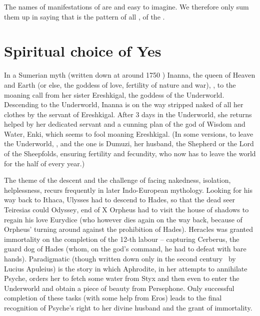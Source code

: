 The names of manifestations of  are  and easy to
imagine. We therefore only sum them up in saying that  is 
the pattern of all ,  of the .


\section{Spiritual choice of Yes}\label{sec:schYes}
%
\pa
In a Sumerian myth (written down at around 1750 \bc)  Inanna, the queen of
Heaven and Earth (or else, the goddess of love, fertility of nature and war),
, 
to the moaning call from her sister Ereshkigal, the goddess of the Underworld.
Descending to the Underworld, Inanna is on the way stripped naked of all her
clothes by the servant of Ereshkigal. After 3 days in the Underworld, she returns
helped by her dedicated servant and a cunning plan of the god of Wisdom and
Water, Enki, which seems to fool moaning Ereshkigal. (In some versions, to leave
the Underworld, , and the one is
Dumuzi, her husband, the Shepherd or the Lord of the Sheepfolds, ensuring
fertility and fecundity, who now has to leave the world for the half of every year.)

The theme of the descent and the challenge of facing nakedness, isolation,
helplessness, recurs frequently  in later Indo-European
mythology.  Looking for his way back to Ithaca, Ulysses had to descend to Hades,
so that the dead seer Teiresias could \citet{tell you about your voyage -- what
  stages you are to make, and how you are to sail the sea so as to reach your
  home.}{Odyssey}{$\!\!$, end of X} Orpheus had to visit the house of shadows to
regain his love Eurydice (who however dies again on the way back, because of
Orpheus' turning around against the prohibition of Hades).  Heracles was granted
immortality on the completion of the 12-th labour -- capturing Cerberus, the
guard dog of Hades (whom, on the god's command, he had to defeat with bare
hands).
Paradigmatic (though written down only in the second century \add\ by Lucius Apuleius)
is the story in which  {Aphrodite}, in 
her attempts to annihilate {Psyche}, orders her to fetch some water from
{Styx} and then 
even to enter the Underworld and obtain a piece of beauty from
{Persephone}. Only successful completion of these tasks (with some help from
{Eros}) leads to the final recognition of {Psyche's} right to her divine
husband and the grant of immortality.

